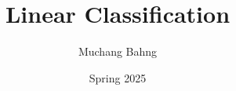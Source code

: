\documentclass{article}
\begin{document}
\title{Linear Classification}
\author{Muchang Bahng}
\date{Spring 2025}

\maketitle
\tableofcontents
\pagebreak












\end{document}
